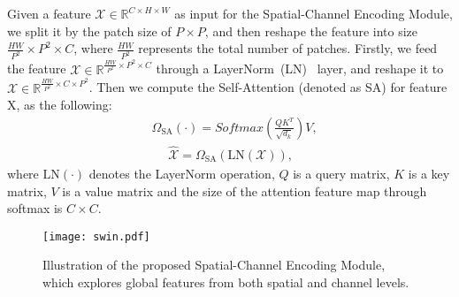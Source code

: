 \documentclass[journal]{IEEEtran}
\begin{document}
Given a feature $\mathcal{X} \in {\mathbb{R}^{C \times H \times W}}$ as input for the Spatial-Channel Encoding Module, we split it by the patch size of $P \times P$, and then reshape the feature into size $\frac{H W}{P^{2}} \times {P^{2}} \times C$, where $\frac{H W}{P^{2}}$ represents the total number of patches. Firstly, we feed the feature $\mathcal{X} \in \mathbb{R}^{\frac{H W}{P^{2}} \times {P^{2} \times C}}$ through a LayerNorm~(LN)~\cite{Ba2016LayerN} layer, and reshape it to $\mathcal{X} \in \mathbb{R}^{\frac{H W}{P^{2}} \times C \times {P^{2}}}$. Then we compute the Self-Attention (denoted as SA) for feature $\text {X}$, as the following:
\begin{equation}
\begin{aligned}
&\Omega_{\operatorname{SA}}(\cdot)=Softmax(\frac{QK^{T}}{\sqrt{d_{k}}})V,\\
&~~~~~~\hat{\mathcal{X}}=\Omega_{\operatorname{SA}}\left(\mathrm{LN}\left(\mathcal{X}\right)\right),
\end{aligned}
\end{equation}
where $\mathrm{LN}(\cdot)$ denotes the LayerNorm operation, $Q$ is a query matrix, $K$ is a key matrix, $V$ is a value matrix and the size of the attention feature map through softmax is ${C} \times {C}$. 

\begin{figure}[htbp]
    \centering
     \texttt{[image: swin.pdf]}
    \vspace{-0.5mm}
    \caption{Illustration of the proposed Spatial-Channel Encoding Module, which explores global features from both spatial and channel levels.}
    \label{fig:3}
\end{figure}
\end{document}
